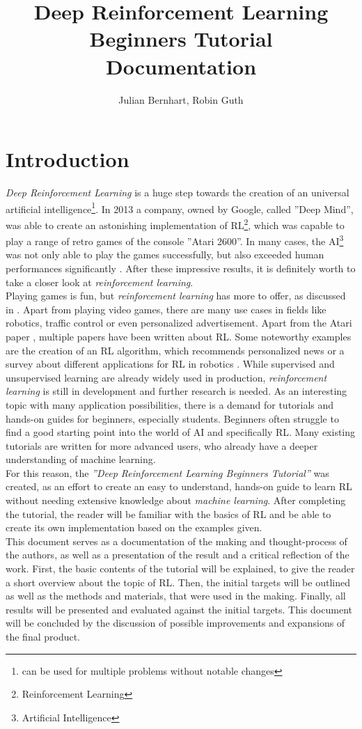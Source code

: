 \documentclass[a4paper]{article}
\title{Deep Reinforcement Learning Beginners Tutorial \\Documentation}
\author{Julian Bernhart, Robin Guth}
\begin{document}
	
	\maketitle
	\tableofcontents
	
	\section{Introduction}
	\textit{Deep Reinforcement Learning} is a huge step towards the creation of an universal artificial intelligence\footnote{can be used for multiple problems without notable changes}.
	In 2013 a company, owned by Google, called ''Deep Mind'', was able to create an astonishing implementation of RL\footnote{Reinforcement Learning}, which was capable to play a range of retro games of the console ''Atari 2600''.
	In many cases, the AI\footnote{Artificial Intelligence} was not only able to play the games successfully, but also exceeded human performances significantly \cite{atari}.
	After these impressive results, it is definitely worth to take a closer look at \textit{reinforcement learning}.\\	  
	Playing games is fun, but \textit{reinforcement learning} has more to offer, as discussed in \cite{usecasesRL}.
	Apart from playing video games, there are many use cases in fields like robotics, traffic control or even personalized advertisement.
	Apart from the Atari paper \cite{atari}, multiple papers have been written about RL.
	Some noteworthy examples are the creation of an RL algorithm, which recommends personalized news \cite{drn} or a survey about different applications for RL in robotics \cite{roboticsRL}. While supervised and unsupervised learning are already widely used in production, \textit{reinforcement learning} is still in development and further research is needed.
	As an interesting topic with many application possibilities, there is a demand for tutorials and hands-on guides for beginners, especially students.
	Beginners often struggle to find a good starting point into the world of AI and specifically RL.
	Many existing tutorials are written for more advanced users, who already have a deeper understanding of machine learning.\\
	For this reason, the \textit{''Deep Reinforcement Learning Beginners Tutorial''} was created, as an effort to create an easy to understand, hands-on guide to learn RL without needing extensive knowledge about \textit{machine learning}.
	After completing the tutorial, the reader will be familiar with the basics of RL and be able to create its own implementation based on the examples given.\\
	This document serves as a documentation of the making and thought-process of the authors, as well as a presentation of the result and a critical reflection of the work.
	First, the basic contents of the tutorial will be explained, to give the reader a short overview about the topic of RL.
	Then, the initial targets will be outlined as well as the methods and materials, that were used in the making.
	Finally, all results will be presented and evaluated against the initial targets. 
	This document will be concluded by the discussion of possible improvements and expansions of the final product.
		 
\end{document}

